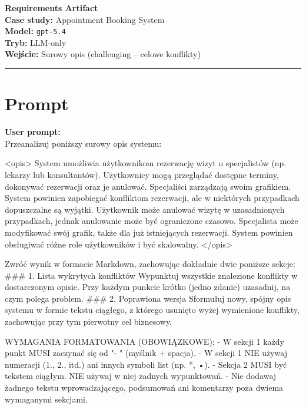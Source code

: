 \documentclass[12pt,a4paper]{article}
\begin{document}
\begin{center}
  {\LARGE\bfseries Requirements Artifact}\\[1.5em]
  {\large \textbf{Case study:} Appointment Booking System}\\[0.3em]
  {\large \textbf{Model:} \texttt{gpt-5.4}}\\[0.3em]
  {\large \textbf{Tryb:} LLM-only}\\[0.3em]
  {\large \textbf{Wejście:} Surowy opis (challenging -- celowe konflikty)}
\end{center}

\vspace{1em}\hrule\vspace{1.5em}

\section{Prompt}

\begin{mdframed}[backgroundcolor=promptbg, linewidth=0pt, innerleftmargin=10pt, innerrightmargin=10pt, innertopmargin=8pt, innerbottommargin=8pt]
\textbf{User prompt:}\\[0.3em]
\small
Przeanalizuj poniższy surowy opis systemu:

<opis>
System umożliwia użytkownikom rezerwację wizyt u specjalistów (np. lekarzy lub konsultantów). Użytkownicy mogą przeglądać dostępne terminy, dokonywać rezerwacji oraz je anulować. Specjaliści zarządzają swoim grafikiem. System powinien zapobiegać konfliktom rezerwacji, ale w niektórych przypadkach dopuszczalne są wyjątki. Użytkownik może anulować wizytę w uzasadnionych przypadkach, jednak anulowanie może być ograniczone czasowo. Specjalista może modyfikować swój grafik, także dla już istniejących rezerwacji. System powinien obsługiwać różne role użytkowników i być skalowalny.
</opis>

Zwróć wynik w formacie Markdown, zachowując dokładnie dwie poniższe sekcje:
### 1. Lista wykrytych konfliktów
Wypunktuj wszystkie znalezione konflikty w dostarczonym opisie. Przy każdym punkcie krótko (jedno zdanie) uzasadnij, na czym polega problem.
### 2. Poprawiona wersja
Sformułuj nowy, spójny opis systemu w formie tekstu ciągłego, z którego usunięto wyżej wymienione konflikty, zachowując przy tym pierwotny cel biznesowy.

WYMAGANIA FORMATOWANIA (OBOWIĄZKOWE):
- W sekcji 1 każdy punkt MUSI zaczynać się od "- " (myślnik + spacja).
- W sekcji 1 NIE używaj numeracji (1., 2., itd.) ani innych symboli list (np. *, •).
- Sekcja 2 MUSI być tekstem ciągłym. NIE używaj w niej żadnych wypunktowań.
- Nie dodawaj żadnego tekstu wprowadzającego, podsumowań ani komentarzy poza dwiema wymaganymi sekcjami.
\end{mdframed}
\end{document}
